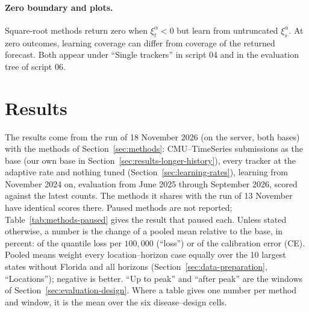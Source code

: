 \documentclass[11pt,a4paper]{article}
\theoremstyle{definition}
\theoremstyle{remark}
\begin{document}
\paragraph{Zero boundary and plots.}
Square-root methods return zero when $\xi_t^\alpha<0$ but learn from
untruncated $\xi_s^\alpha$. At zero outcomes, learning coverage can
differ from coverage of the returned forecast. Both appear under
``Single trackers'' in script 04 and in the evaluation tree of script 06.

\section{Results}
\label{sec:results}
The results come from the run of 18 November 2026 (on the server, both
bases) with the methods of Section~\ref{sec:methods}: CMU--TimeSeries
submissions as the base (our own base in
Section~\ref{sec:results-longer-history}), every tracker at the adaptive
rate and nothing tuned (Section~\ref{sec:learning-rates}), learning from
November 2024 on, evaluation from June 2025 through September 2026, scored
against the latest counts. The methods it shares with the run of 13
November have identical scores there. Paused methods are not reported;
Table~\ref{tab:methods-paused} gives the result that paused each. Unless
stated otherwise, a number is the change of a pooled mean relative to the
base, in percent: of the quantile loss per $100{,}000$ (``loss'') or of the
calibration error (CE). Pooled means weight every location--horizon case
equally over the 10 largest states without Florida and all horizons
(Section~\ref{sec:data-preparation}, ``Locations''); negative is better.
``Up to peak'' and ``after peak'' are the windows of
Section~\ref{sec:evaluation-design}. Where a table gives one number per
method and window, it is the mean over the six disease--design cells.
\end{document}
